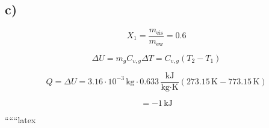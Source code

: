 

\subsection*{c)}
\[
X_1 = \frac{m_{\text{eis}}}{m_{\text{ew}}} = 0.6
\]

\[
\Delta U = m_{g} C_{v,g} \Delta T = C_{v,g} (T_2 - T_1)
\]

\[
Q = \Delta U = 3.16 \cdot 10^{-3} \, \text{kg} \cdot 0.633 \, \frac{\text{kJ}}{\text{kg} \cdot \text{K}} \left( 273.15 \, \text{K} - 773.15 \, \text{K} \right)
\]

\[
= -1 \, \text{kJ}
\]

``````latex